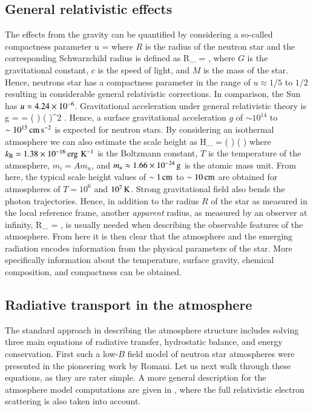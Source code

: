 \subsection{General relativistic effects}
The effects from the gravity can be quantified by considering a so-called compactness parameter
\be
u = 
\ee
where $R$ is the radius of the neutron star and the corresponding Schwarzchild radius is defined as
\be
R_{} =    \km,
\ee
where $G$ is the gravitational constant, $c$ is the speed of light, and $M$ is the mass of the star.
Hence, neutrons star has a compactness parameter in the range of $u \approx 1/5$ to $1/2$ resulting in considerable general relativistic corrections.
In comparison, the Sun has $u \approx 4.24 \times 10^{-6}$.
Gravitational acceleration under general relativistic theory is\cite[see e.g.][]{Gravitation, Wald84}
\be
g =   =   \left(  \right) \left(  \right)^2 \cmss.
\ee
Hence, a surface gravitational acceleration $g$ of $\sim 10^{14}$ to $\sim 10^{15}\, \mathrm{cm}\,\mathrm{s}^{-2}$ is expected for neutron stars.
By considering an isothermal atmosphere we can also estimate the scale height as
\be
H_{} =  \approx {} \left(  \right) \left(  \right) \cm
\ee
where $k_{\mathrm{B}} = 1.38 \times 10^{-16} \, \mathrm{erg} \, \, \mathrm{K}^{-1}$ is the Boltzmann constant, $T$ is the temperature of the atmosphere, $m_i = A m_u$, and $m_u \approx 1.66 \times 10^{-24}\, \mathrm{g}$ is the atomic mass unit.
From here, the typical scale height values of $\sim 1\, \mathrm{cm}$ to $\sim 10\, \mathrm{cm}$ are obtained for atmospheres of $T=10^6$ and $10^7\, \mathrm{K}$.\cite{ZP02, Potekhin14}
Strong gravitational field also bends the photon trajectories.\cite{PFC83}
Hence, in addition to the radius $R$ of the star as measured in the local reference frame, another \emph{apparent} radius, as measured by an observer at infinity, 
\be
R_{\infty} = ,
\ee
is usually needed when describing the observable features of the atmosphere.
From here it is then clear that the atmosphere and the emerging radiation encodes information from the physical parameters of the star.
More specifically information about the temperature, surface gravity, chemical composition, and compactness can be obtained.

\subsection{Radiative transport in the atmosphere}
The standard approach in describing the atmosphere structure includes solving three main equations of radiative transfer, hydrostatic balance, and energy conservation.
First such a low-$B$ field model of neutron star atmospheres were presented in the pioneering work by Romani.\cite{Romani87}
Let us next walk through these equations, as they are rater simple.
A more general description for the atmosphere model computations are given in , where the full relativistic electron scattering is also taken into account.

